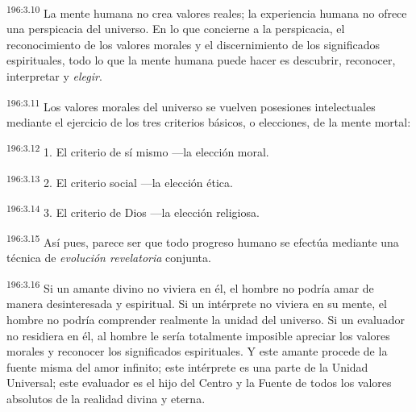 \par
\textsuperscript{196:3.10} La mente humana no crea valores reales; la experiencia humana no ofrece una perspicacia del universo. En lo que concierne a la perspicacia, el reconocimiento de los valores morales y el discernimiento de los significados espirituales, todo lo que la mente humana puede hacer es descubrir, reconocer, interpretar y \textit{elegir}.

\par
\textsuperscript{196:3.11} Los valores morales del universo se vuelven posesiones intelectuales mediante el ejercicio de los tres criterios básicos, o elecciones, de la mente mortal:

\par
\textsuperscript{196:3.12} 1. El criterio de sí mismo ---la elección moral.

\par
\textsuperscript{196:3.13} 2. El criterio social ---la elección ética.

\par
\textsuperscript{196:3.14} 3. El criterio de Dios ---la elección religiosa.

\par
\textsuperscript{196:3.15} Así pues, parece ser que todo progreso humano se efectúa mediante una técnica de \textit{evolución revelatoria} conjunta.

\par
\textsuperscript{196:3.16} Si un amante divino no viviera en él, el hombre no podría amar de manera desinteresada y espiritual. Si un intérprete no viviera en su mente, el hombre no podría comprender realmente la unidad del universo. Si un evaluador no residiera en él, al hombre le sería totalmente imposible apreciar los valores morales y reconocer los significados espirituales. Y este amante procede de la fuente misma del amor infinito; este intérprete es una parte de la Unidad Universal; este evaluador es el hijo del Centro y la Fuente de todos los valores absolutos de la realidad divina y eterna.

